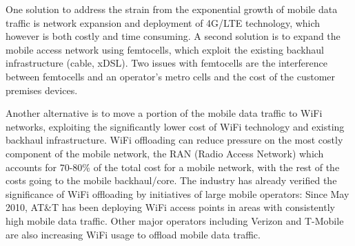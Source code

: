 \documentclass{sig-alternate}
\begin{document}
One solution to address the strain from the exponential growth of mobile data traffic is network expansion and deployment of 4G/LTE technology, which however is both costly and time consuming.
A second solution is to expand the mobile access network using femtocells, which  exploit the existing backhaul infrastructure (cable, xDSL).
Two issues with femtocells are the interference between femtocells and an operator's metro cells  and the cost of the customer premises devices.

Another alternative is to move a portion of the mobile data traffic to WiFi networks, exploiting the significantly lower cost of WiFi technology and existing backhaul infrastructure.
WiFi offloading can reduce pressure on the most costly component of the mobile network, the RAN (Radio Access Network) which accounts for 70-80\% of the total cost for a mobile network, with the rest of the costs going to the mobile backhaul/core.
The industry has already verified the significance of WiFi offloading by initiatives of large mobile operators: Since May 2010, AT\&T has been deploying WiFi access points in areas with consistently high mobile data traffic. Other major operators including Verizon  and T-Mobile  are also increasing WiFi usage to offload mobile data traffic.
\end{document}
